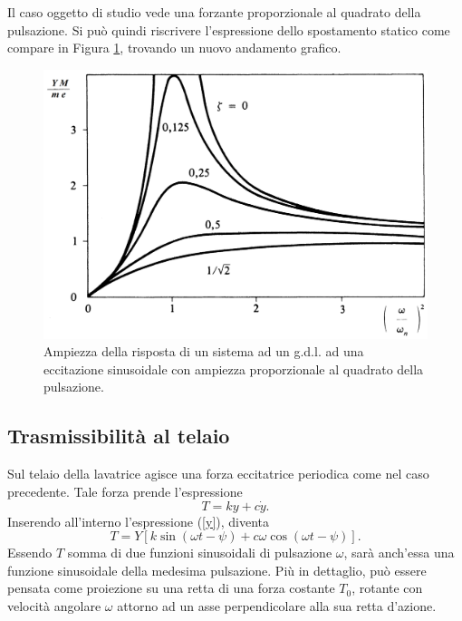Il caso oggetto di studio vede una forzante proporzionale al quadrato della pulsazione. Si può quindi riscrivere l'espressione dello spostamento statico come compare in Figura \ref{AmpiezzaEfaseQuadratoDellaPulsazione}, trovando un nuovo andamento grafico.
\begin{figure}[h]
    \centering
    \includegraphics[scale=0.14]{Immagini/AmpiezzaEfaseQuadratoDellaPulsazione.png}
    \caption{Ampiezza della risposta di un sistema ad un g.d.l. ad una eccitazione sinusoidale con ampiezza proporzionale al quadrato della pulsazione.}
    \label{AmpiezzaEfaseQuadratoDellaPulsazione}
\end{figure}
\subsection{Trasmissibilità al telaio}
Sul telaio della lavatrice agisce una forza eccitatrice periodica come nel caso precedente. Tale forza prende l'espressione \begin{equation}
    T=k y+c \dot y.
\end{equation}
Inserendo all'interno l'espressione (\ref{y}), diventa
\begin{equation}
    T=Y\left[k\sin (\omega t -\psi)+c \omega\cos(\omega t-\psi)\right].
\end{equation}
Essendo $T$ somma di due funzioni sinusoidali di pulsazione $\omega$, sarà anch'essa una funzione sinusoidale della medesima pulsazione. Più in dettaglio, può essere pensata come proiezione su una retta di una forza costante $T_0$, rotante con velocità angolare $\omega$ attorno ad un asse perpendicolare alla sua retta d'azione. 

